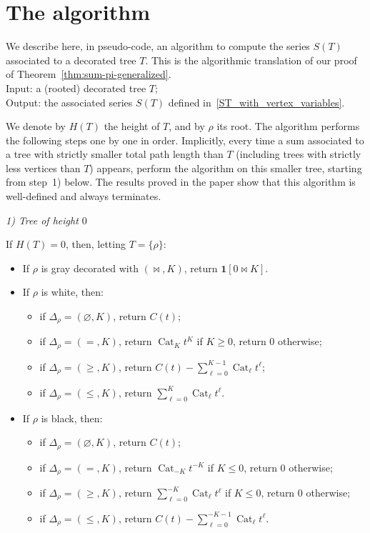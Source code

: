 \documentclass[12pt]{amsart}
\newcommand{\revision}[1]{{#1}}
\theoremstyle{plain}
\theoremstyle{remark}
\def\One{\bm{1}}
\DeclareMathOperator{\Cat}{Cat}
\begin{document}
\section{The algorithm}
\label{appendix:algo}

\revision{
We describe here, in pseudo-code, an algorithm to compute the series $S(T)$ associated to a decorated tree $T$.
This is the algorithmic translation of our proof of Theorem~\ref{thm:sum-pi-generalized}.\\
{\sc Input:} a (rooted) decorated tree $T$;\\
{\sc Output:} the associated series $S(T)$ defined in~\eqref{ST_with_vertex_variables}.}
\medskip

We denote by $H(T)$ the height of $T$, and by $\rho$ its root. The algorithm performs the following steps one by one in order. Implicitly, every time a sum associated to a tree with strictly smaller total path length than $T$ (including trees with strictly less vertices than $T$) appears, perform the algorithm on this smaller tree, starting from step~1) below.
The results proved in the paper show that this algorithm is well-defined and always terminates.

\emph{1) Tree of height $0$}

If $H(T)=0$, then, letting $T=\{\rho\}$:
\begin{itemize}
\item If $\rho$ is gray decorated with $(\bowtie, K)$, return $\One[0 \bowtie K]$.
\item If $\rho$ is white, then:
\begin{itemize}
\item if $\Delta_\rho=(\varnothing,K)$, return $C(t)$;
\item if $\Delta_\rho=(=,K)$, return $\Cat_K t^K$ if $K \geq 0$, return $0$ otherwise;
\item if $\Delta_\rho=(\geq,K)$, return $C(t)- \sum_{\ell=0}^{K-1} \Cat_\ell t^\ell$;
\item if $\Delta_\rho=(\leq,K)$, return $\sum_{\ell=0}^{K} \Cat_\ell t^\ell$.
\end{itemize}
\item If $\rho$ is black, then:
\begin{itemize}
\item if $\Delta_\rho=(\varnothing,K)$, return $C(t)$;
\item if $\Delta_\rho=(=,K)$, return $\Cat_{-K} t^{-K}$ if $K \le 0$, return $0$ otherwise;
\item if $\Delta_\rho=(\geq,K)$, return $\sum_{\ell=0}^{-K} \Cat_\ell t^\ell$ if $K \leq 0$, return $0$ otherwise;
\item if $\Delta_\rho=(\leq,K)$, return $C(t)- \sum_{\ell=0}^{-K-1} \Cat_\ell t^\ell$.
\end{itemize}
\end{itemize} 
\end{document}

